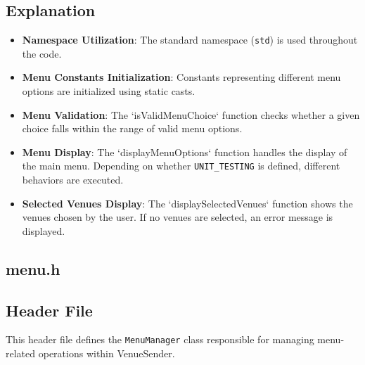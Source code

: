 \documentclass{article}
\begin{document}
	\subsection*{Explanation}
	\begin{itemize}
		\item \textbf{Namespace Utilization}: The standard namespace (\texttt{std}) is used throughout the code.
		\item \textbf{Menu Constants Initialization}: Constants representing different menu options are initialized using static casts.
		\item \textbf{Menu Validation}: The `isValidMenuChoice` function checks whether a given choice falls within the range of valid menu options.
		\item \textbf{Menu Display}: The `displayMenuOptions` function handles the display of the main menu. Depending on whether \texttt{UNIT\_TESTING} is defined, different behaviors are executed.
		\item \textbf{Selected Venues Display}: The `displaySelectedVenues` function shows the venues chosen by the user. If no venues are selected, an error message is displayed.
	\end{itemize}

	\subsection{menu.h}
	
	\subsection*{Header File}
	This header file defines the \texttt{MenuManager} class responsible for managing menu-related operations within VenueSender.
	
\end{document}
